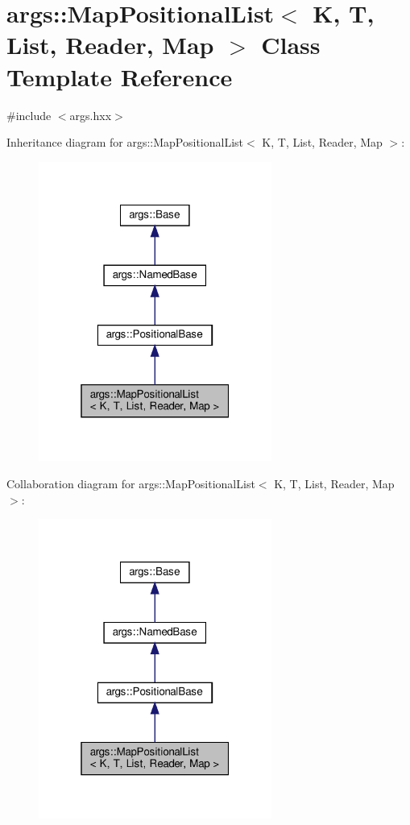 \hypertarget{classargs_1_1_map_positional_list}{}\section{args\+:\+:Map\+Positional\+List$<$ K, T, List, Reader, Map $>$ Class Template Reference}
\label{classargs_1_1_map_positional_list}


{\ttfamily \#include $<$args.\+hxx$>$}



Inheritance diagram for args\+:\+:Map\+Positional\+List$<$ K, T, List, Reader, Map $>$\+:\nopagebreak
\begin{figure}[H]
\begin{center}
\leavevmode
\includegraphics[width=217pt]{classargs_1_1_map_positional_list__inherit__graph}
\end{center}
\end{figure}


Collaboration diagram for args\+:\+:Map\+Positional\+List$<$ K, T, List, Reader, Map $>$\+:\nopagebreak
\begin{figure}[H]
\begin{center}
\leavevmode
\includegraphics[width=217pt]{classargs_1_1_map_positional_list__coll__graph}
\end{center}
\end{figure}
